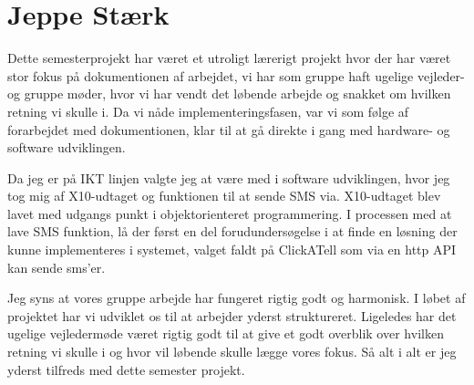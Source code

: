 \section{Jeppe Stærk}
Dette semesterprojekt har været et utroligt lærerigt projekt hvor der har været stor fokus på dokumentionen af arbejdet, vi har som gruppe haft ugelige vejleder- og gruppe møder, hvor vi har vendt det løbende arbejde og snakket om hvilken retning vi skulle i. Da vi nåde implementeringsfasen, var vi som følge af forarbejdet med dokumentionen, klar til at gå direkte i gang med hardware- og software udviklingen.

Da jeg er på IKT linjen valgte jeg at være med i software udviklingen, hvor jeg tog mig af X10-udtaget og funktionen til at sende SMS via. X10-udtaget blev lavet med udgangs punkt i objektorienteret programmering. I processen med at lave SMS funktion, lå der først en del forudundersøgelse i at finde en løsning der kunne implementeres i systemet, valget faldt på ClickATell som via en http API kan sende sms'er. 

Jeg syns at vores gruppe arbejde har fungeret rigtig godt og harmonisk. I løbet af projektet har vi udviklet os til at arbejder yderst struktureret. Ligeledes har det ugelige vejledermøde været rigtig godt til at give et godt overblik over hvilken retning vi skulle i og hvor vil løbende skulle lægge vores fokus. Så alt i alt er jeg yderst tilfreds med dette semester projekt.